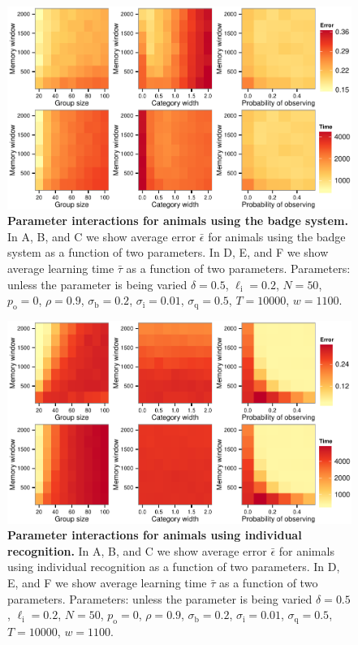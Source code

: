 \begin{figure}[ht]
\includegraphics[width=.8\textwidth]{figures/parameter_interactions_badge.pdf}
\caption{\sffamily\small\textbf{Parameter interactions for animals using the badge system.}
In A, B, and C we show average error $\bar{\epsilon}$ for animals using the badge system as a function of two parameters. In D, E, and F we show average learning time $\bar{\tau}$ as a function of two parameters. Parameters: unless the parameter is being varied $\delta = 0.5$, $\ell_\text{i}=0.2$, $N=50$, $p_\text{o}=0$, $\rho=0.9$, $\sigma_\text{b}=0.2$, $\sigma_\text{i}=0.01$, $\sigma_\text{q}=0.5$, $T=10000$, $w=1100$.}
\label{interactions_badge}
\end{figure}

\begin{figure}[ht]
\includegraphics[width=.8\textwidth]{figures/parameter_interactions_indiv.pdf}
\caption{\sffamily\small\textbf{Parameter interactions for animals using individual recognition.}
In A, B, and C we show average error $\bar{\epsilon}$ for animals using individual recognition as a function of two parameters. In D, E, and F we show average learning time $\bar{\tau}$ as a function of two parameters. Parameters: unless the parameter is being varied $\delta = 0.5$, $\ell_\text{i}=0.2$, $N=50$, $p_\text{o}=0$, $\rho=0.9$, $\sigma_\text{b}=0.2$, $\sigma_\text{i}=0.01$, $\sigma_\text{q}=0.5$, $T=10000$, $w=1100$.}
\label{interactions_indiv}
\end{figure}

